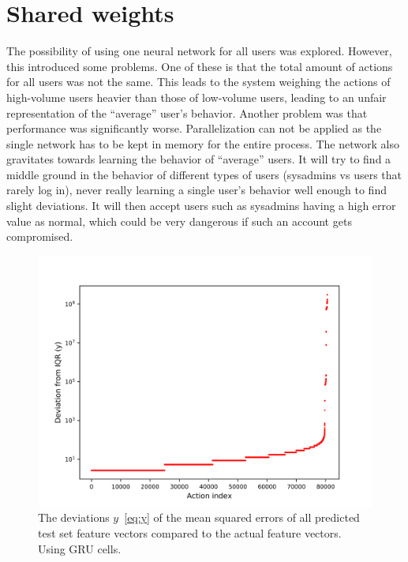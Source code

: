 \section{Shared weights}
The possibility of using one neural network for all users was explored. However, this introduced some problems. One of these is that the total amount of actions for all users was not the same. This leads to the system weighing the actions of high-volume users heavier than those of low-volume users, leading to an unfair representation of the \enquote{average} user's behavior. Another problem was that performance was significantly worse. Parallelization can not be applied as the single network has to be kept in memory for the entire process. The network also gravitates towards learning the behavior of \enquote{average} users. It will try to find a middle ground in the behavior of different types of users (sysadmins vs users that rarely log in), never really learning a single user's behavior well enough to find slight deviations. It will then accept users such as sysadmins having a high error value as normal, which could be very dangerous if such an account gets compromised.

\begin{figure}
	\begin{center}
		\includegraphics[scale=0.1]{experiments/cell/deviations/gru}
	\end{center}
	\caption{The deviations \(y\)~\ref{eq:y} of the mean squared errors of all predicted test set feature vectors compared to the actual feature vectors. Using GRU cells.~\label{fig:gru_deviations}}
\end{figure}

